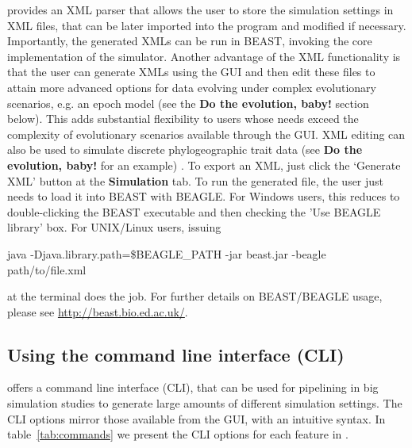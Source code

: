 {\bussname} provides an XML parser that allows the user to store the simulation settings in XML files, that can be later imported into the program and modified if necessary. Importantly, the generated XMLs can be run in BEAST, invoking the core implementation of the simulator.
Another advantage of the XML functionality is that the user can generate XMLs using the GUI and then edit these files to attain more advanced options for data evolving under complex evolutionary scenarios, e.g. an epoch model (see the \textbf{Do the evolution, baby!} section below).
This adds substantial flexibility to users whose needs exceed the complexity of evolutionary scenarios available through the GUI.
XML editing can also be used to simulate discrete phylogeographic trait data (see \textbf{Do the evolution, baby!} for an example) .
To export an XML, just click the `Generate XML' button at the \textbf{Simulation} tab.
To run the generated file, the user just needs to load it into BEAST with BEAGLE. For Windows users, this reduces to double-clicking the BEAST executable and then checking the 'Use BEAGLE library' box. For UNIX/Linux users, issuing 

\begin{code}
java -Djava.library.path=\$BEAGLE\_PATH -jar beast.jar -beagle path/to/file.xml
\end{code}

\noindent
at the terminal does the job.
For further details on BEAST/BEAGLE usage, please see \url{http://beast.bio.ed.ac.uk/}.


\subsection{Using the command line interface (CLI)}

{\bussname} offers a command line interface (CLI), that can be used for pipelining in big simulation studies to generate large amounts of different simulation settings.
The CLI options mirror those available from the GUI, with an intuitive syntax.
In table~\ref{tab:commands} we present the CLI options for each feature in {\bussname}.

